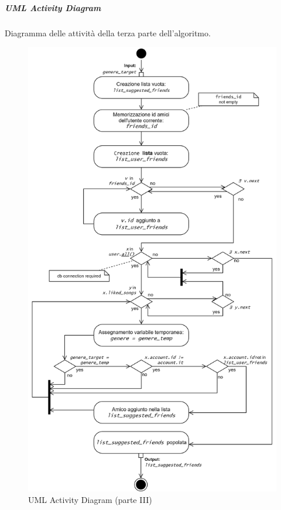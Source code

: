\newpage

\subparagraph{UML Activity Diagram}
Diagramma delle attività della terza parte dell'algoritmo.
\begin{figure} [H]
    \centering
    \includegraphics[scale=0.7]{images/flowchart_3_UML.png}
    \caption{UML Activity Diagram (parte III)}
    \label{fig-uml-ac-3}
\end{figure}



